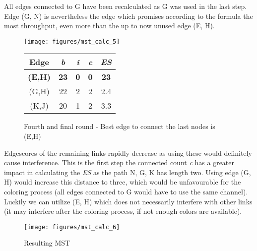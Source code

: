       All edges connected to G have been recalculated as G was used in the last step. Edge (G, N) is nevertheless the edge which promises according to 
      the formula the most throughput, even more than the up to now unused edge (E, H).
      
      \begin{figure}[h!]
	\centering
	\begin{minipage}{7.5cm}
	  \texttt{[image: figures/mst\_calc\_5]}
	\end{minipage}
	\begin{minipage}{4cm}
	  \begin{tabular}{c||c|c|c||c}
	    Edge & \textit{b} & \textit{i} & \textit{c} & \textit{ES}\\ \hline\hline
	    \textbf{(E,H)} & \textbf{23} & \textbf{0} & \textbf{0} & \textbf{23} \\ \hline
	    (G,H) & 22 & 2 & 2 & 2.4 \\ \hline
	    (K,J) & 20 & 1 & 2 & 3.3 \\ \hline
	  \end{tabular}
	\end{minipage}
	\caption{Fourth and final round - Best edge to connect the last nodes is (E,H)}
	\label{fig:mst_calc_5}
      \end{figure}
      
      Edgescores of the remaining links rapidly decrease as using these would definitely cause interference.
      This is the first step the connected count \textit{c} has a greater impact in calculating the \textit{ES} as the path N, G, K has length two.
      Using edge (G, H) would increase this distance to three,
      which would be unfavourable for the coloring process (all edges connected to G would have to use the same channel).
      Luckily we can utilize (E, H) which does not necessarily interfere with other links (it may interfere after the coloring process, if not enough colors are available).
      
      \begin{figure}[h!]
	\centering
	\begin{minipage}{7.5cm}
	  \texttt{[image: figures/mst\_calc\_6]}
	\end{minipage}
	\begin{minipage}{4cm}
	  \hspace{4cm}
	\end{minipage}
	\caption{Resulting MST}
	\label{fig:mst_calc_6}
      \end{figure}  
     \newpage
      
